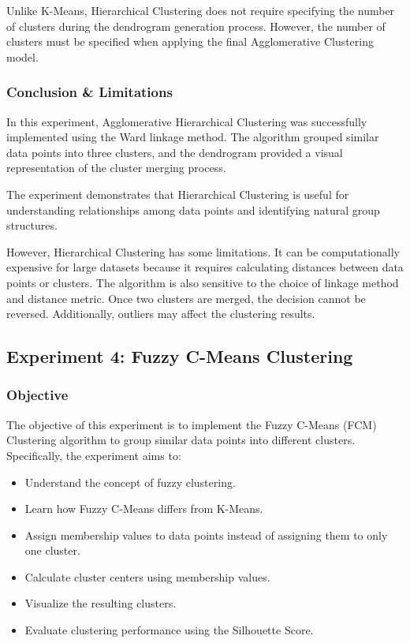 \documentclass[a4paper,11pt]{article}
\begin{document}
Unlike K-Means, Hierarchical Clustering does not require specifying the number of clusters during the dendrogram generation process. However, the number of clusters must be specified when applying the final Agglomerative Clustering model.

\subsubsection{Conclusion \& Limitations}

In this experiment, Agglomerative Hierarchical Clustering was successfully implemented using the Ward linkage method. The algorithm grouped similar data points into three clusters, and the dendrogram provided a visual representation of the cluster merging process.

The experiment demonstrates that Hierarchical Clustering is useful for understanding relationships among data points and identifying natural group structures.

However, Hierarchical Clustering has some limitations. It can be computationally expensive for large datasets because it requires calculating distances between data points or clusters. The algorithm is also sensitive to the choice of linkage method and distance metric. Once two clusters are merged, the decision cannot be reversed. Additionally, outliers may affect the clustering results.
\subsection{Experiment 4: Fuzzy C-Means Clustering}

\subsubsection{Objective}
The objective of this experiment is to implement the Fuzzy C-Means (FCM) Clustering algorithm to group similar data points into different clusters. Specifically, the experiment aims to:
\begin{itemize}
    \item Understand the concept of fuzzy clustering.
    \item Learn how Fuzzy C-Means differs from K-Means.
    \item Assign membership values to data points instead of assigning them to only one cluster.
    \item Calculate cluster centers using membership values.
    \item Visualize the resulting clusters.
    \item Evaluate clustering performance using the Silhouette Score.
\end{itemize}
\end{document}
